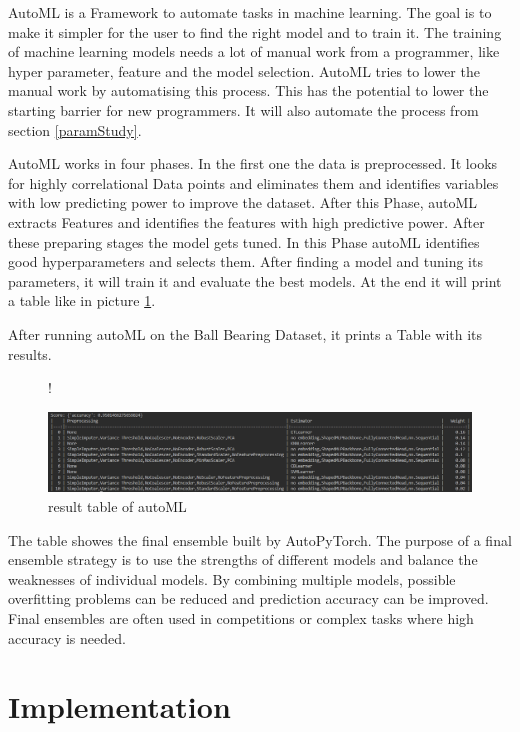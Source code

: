 \documentclass[a4paper, 12pt, oneside]{scrbook}
\begin{document}
			\noindent AutoML is a Framework to automate tasks in machine learning. The goal is to make it simpler for the user to find the right model and to train it. The training of machine learning models needs a lot of manual work from a programmer, like hyper parameter, feature and the model selection. AutoML tries to lower the manual work by automatising this process. This has the potential to lower the starting barrier for new programmers. It will also automate the process from section \ref{paramStudy}. 
			
			AutoML works in four phases. In the first one the data is preprocessed. It looks for highly correlational Data points and eliminates them and identifies variables with low predicting power to improve the dataset. After this Phase, autoML extracts Features and identifies the features with high predictive power. After these preparing stages the model gets tuned. In this Phase autoML identifies good hyperparameters and selects them. After finding a model and tuning its parameters, it will train it and evaluate the best models. At the end it will print a table like in picture \ref{fig:autoML_Table}.
			
			After running autoML on the Ball Bearing Dataset, it prints a Table with its results. 
			
			\begin{figure} [H]
				\centering
				\resizebox{\linewidth} {!} {
					\includegraphics{res/autoML.png}
					
				}
				\caption{result table of autoML}
				\label{fig:autoML_Table}
			\end{figure}
			
			The table showes the final ensemble built by AutoPyTorch. The purpose of a final ensemble strategy is to use the strengths of different models and balance the weaknesses of individual models. By combining multiple models, possible overfitting problems can be reduced and prediction accuracy can be improved. Final ensembles are often used in competitions or complex tasks where high accuracy is needed.
			
	 
	 
	\chapter{Implementation}
		
\end{document}

